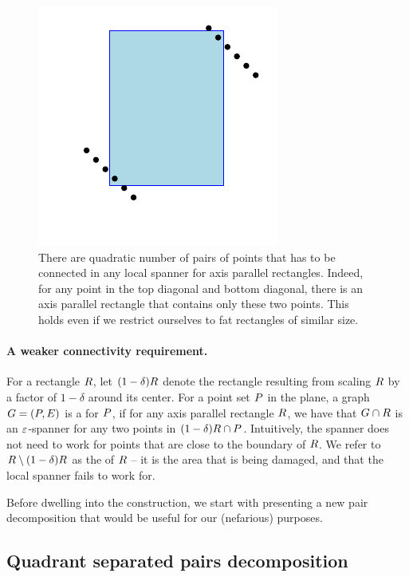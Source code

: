 \documentclass[12pt]{article}%
\begin{document}
\begin{figure}
    \centerline{\includegraphics{figs/local_rectangles}}
    \caption{There are quadratic number of pairs of points that has to
       be connected in any local spanner for axis parallel
       rectangles. Indeed, for any point in the top diagonal and
       bottom diagonal, there is an axis parallel rectangle that
       contains only these two points. This holds even if we restrict
       ourselves to fat rectangles of similar size.}
\end{figure}


\paragraph{A weaker connectivity requirement.}

For a rectangle $R$, let $(1-\delta)R$ denote the rectangle
resulting from scaling $R$ by a factor of $1-\delta$ around its
center. For a point set $P$ in the plane, a graph $G =(P,E)$ is
a  for $P$, if for any
axis parallel rectangle $R$, we have that $G \cap {R}$
is an $\varepsilon$-spanner for any two points in $(1-\delta)R \cap
P$. Intuitively, the spanner does not need to work for points that
are close to the boundary of $R$. We refer to
$R \setminus (1-\delta)R$ as the  of $R$ --
it is the area that is being damaged, and that the local spanner fails
to work for.

Before dwelling into the construction, we start with presenting a new
pair decomposition that would be useful for our (nefarious) purposes.



\subsection{Quadrant separated pairs decomposition}
\end{document}
